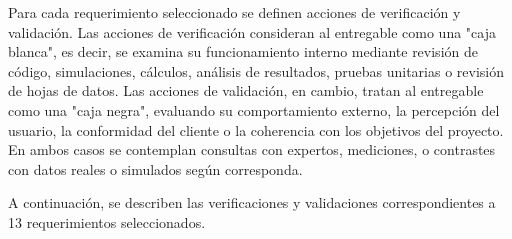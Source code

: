 \documentclass[12pt]
{charter}
\begin{document}
Para cada requerimiento seleccionado se definen acciones de verificación y validación.  
Las acciones de verificación consideran al entregable como una "caja blanca", es decir, se examina su funcionamiento interno mediante revisión de código, simulaciones, cálculos, análisis de resultados, pruebas unitarias o revisión de hojas de datos.  
Las acciones de validación, en cambio, tratan al entregable como una "caja negra", evaluando su comportamiento externo, la percepción del usuario, la conformidad del cliente o la coherencia con los objetivos del proyecto.  
En ambos casos se contemplan consultas con expertos, mediciones, o contrastes con datos reales o simulados según corresponda.

A continuación, se describen las verificaciones y validaciones correspondientes a 13 requerimientos seleccionados.
\end{document}
